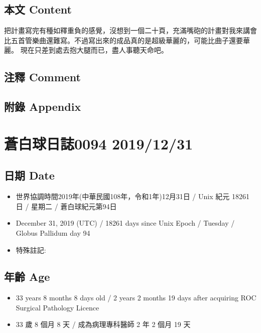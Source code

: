\documentclass[a5paper, 12pt
]{book}
\providecommand{\tightlist}{%
  \setlength{\itemsep}{0pt}\setlength{\parskip}{0pt}}
\begin{document}
\hypertarget{ux672cux6587-content-29}{%
\subsection{本文 Content}\label{ux672cux6587-content-29}}

把計畫寫完有種如釋重負的感覺，沒想到一個二十頁，充滿嘴砲的計畫對我來講會比五首管樂曲還難寫。不過寫出來的成品真的是超級華麗的，可能比曲子還要華麗。
現在只差到處去抱大腿而已，盡人事聽天命吧。

\hypertarget{ux6ce8ux91cb-comment-28}{%
\subsection{注釋 Comment}\label{ux6ce8ux91cb-comment-28}}

\hypertarget{ux9644ux9304-appendix-29}{%
\subsection{附錄 Appendix}\label{ux9644ux9304-appendix-29}}

\hypertarget{ux84bcux767dux7403ux65e5ux8a8c0094-20191231}{%
\section{蒼白球日誌0094
2019/12/31}\label{ux84bcux767dux7403ux65e5ux8a8c0094-20191231}}

\hypertarget{ux65e5ux671f-date-30}{%
\subsection{日期 Date}\label{ux65e5ux671f-date-30}}

\begin{itemize}
\tightlist
\item
  世界協調時間2019年(中華民國108年，令和1年)12月31日 / Unix 紀元 18261
  日 / 星期二 / 蒼白球紀元第94日
\item
  December 31, 2019 (UTC) / 18261 days since Unix Epoch / Tuesday /
  Globus Pallidum day 94
\item
  特殊註記:
\end{itemize}

\hypertarget{ux5e74ux9f61-age-30}{%
\subsection{年齡 Age}\label{ux5e74ux9f61-age-30}}

\begin{itemize}
\tightlist
\item
  33 years 8 months 8 days old / 2 years 2 months 19 days after
  acquiring ROC Surgical Pathology Licence
\item
  33 歲 8 個月 8 天 / 成為病理專科醫師 2 年 2 個月 19 天
\end{itemize}
\end{document}
